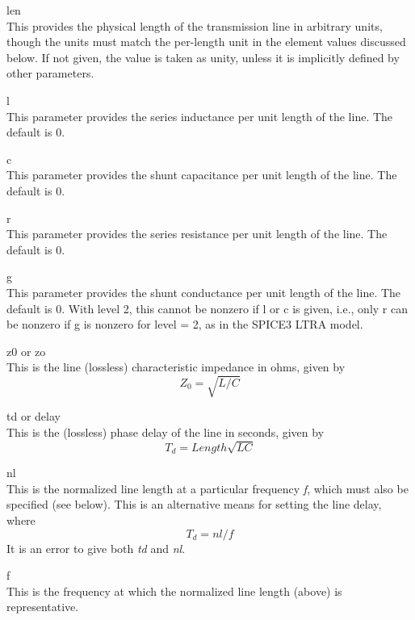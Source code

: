 \begin{description}
\item{\vt len}\\
This provides the physical length of the transmission line in
arbitrary units, though the units must match the per-length unit in
the element values discussed below.  If not given, the value is taken
as unity, unless it is implicitly defined by other parameters.

\item{\vt l}\\
This parameter provides the series inductance per unit length of the
line.  The default is 0.

\item{\vt c}\\
This parameter provides the shunt capacitance per unit length of the
line.  The default is 0.

\item{\vt r}\\
This parameter provides the series resistance per unit length of the
line.  The default is 0.

\item{\vt g}\\
This parameter provides the shunt conductance per unit length of the
line.  The default is 0.  With level 2, this cannot be nonzero if
{\vt l} or {\vt c} is given, i.e., only {\vt r} can be nonzero if
{\vt g} is nonzero for level = 2, as in the SPICE3 LTRA model.

\item{{\vt z0} or {\vt zo}}\\
This is the line (lossless) characteristic impedance in ohms, given by
\begin{displaymath}
Z_0 = \sqrt{L/C}
\end{displaymath}

\item{{\vt td} or {\vt delay}}\\
This is the (lossless) phase delay of the line in seconds, given by
\begin{displaymath}
T_d = Length\sqrt{LC}
\end{displaymath}

\item{\vt nl}\\
This is the normalized line length at a particular frequency {\it f},
which must also be specified (see below).  This is an alternative
means for setting the line delay, where
\begin{displaymath}
T_d = nl/f
\end{displaymath}
It is an error to give both {\it td} and {\it nl}.

\item{\vt f}\\
This is the frequency at which the normalized line length (above) is
representative.
\end{description}

